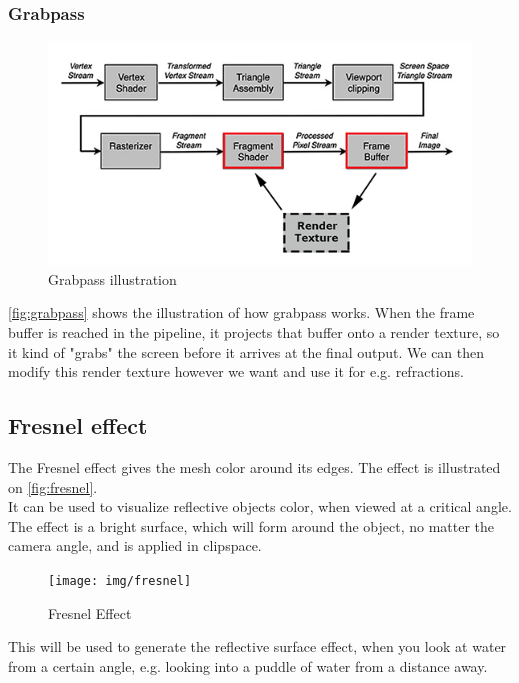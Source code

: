 \documentclass{article}
\begin{document}
\subsubsection{Grabpass}
\label{sec:grabpass}
\begin{figure}[H]
	\centering
	\includegraphics[width=\textwidth]{img/grabpass}
	\caption{Grabpass illustration}
	\label{fig:grabpass}
\end{figure}
\autoref{fig:grabpass} shows the illustration of how grabpass works. When the frame buffer is reached in the pipeline, it projects that buffer onto a render texture, so it kind of "grabs" the screen before it arrives at the final output. We can then modify this render texture however we want and use it for e.g. refractions.

\subsection{Fresnel effect}
\label{sec:fresnel_effect}
The Fresnel effect gives the mesh color around its edges. The effect is illustrated on \autoref{fig:fresnel}.\\It can be used to visualize reflective objects color, when viewed at a critical angle. The effect is a bright surface, which will form around the object, no matter the camera angle, and is applied in clipspace.
\begin{figure}[H]
    \centering
    \texttt{[image: img/fresnel]}
    \caption{Fresnel Effect\protect\footnotemark}
    \label{fig:fresnel}
\end{figure}
This will be used to generate the reflective surface effect, when you look at water from a certain angle, e.g. looking into a puddle of water from a distance away.
\end{document}
